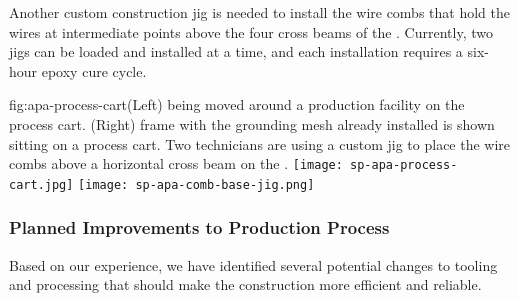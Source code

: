 Another custom construction jig is needed to install the wire combs that hold the wires at intermediate points above the four cross beams of the .  Currently, two jigs can be loaded and installed at a time, and each installation requires a six-hour epoxy cure cycle. %

\begin{dunefigure}{fig:apa-process-cart}{(Left)  being moved around a production facility on the process cart. (Right)  frame with the grounding mesh already installed is shown sitting on a process cart.  Two technicians are using a custom jig to place the wire combs above a horizontal cross beam on the .}
\texttt{[image: sp-apa-process-cart.jpg]}
\texttt{[image: sp-apa-comb-base-jig.png]}
\end{dunefigure}


\subsubsection{Planned Improvements to Production Process}

Based on our  experience, we have identified several potential changes to tooling and processing that should make the  construction more efficient and reliable. 

